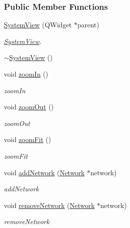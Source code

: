 \subsubsection*{Public Member Functions}
\begin{DoxyCompactItemize}
\item 
\hyperlink{group___graphics_ga660a455ff7b98cb92410b0bf1cbb2eeb}{System\+View} (Q\+Widget $\ast$parent)
\begin{DoxyCompactList}\small\item\em \hyperlink{class_system_view}{System\+View}. \end{DoxyCompactList}\item 
\hyperlink{group___graphics_ga0091352981c1efa5498819b69698db44}{$\sim$\+System\+View} ()
\item 
void \hyperlink{group___graphics_ga93170319ee5fbf9098353b383fc8a368}{zoom\+In} ()
\begin{DoxyCompactList}\small\item\em zoom\+In \end{DoxyCompactList}\item 
void \hyperlink{group___graphics_gaf971471c76265ec21cdde2aafe9b609f}{zoom\+Out} ()
\begin{DoxyCompactList}\small\item\em zoom\+Out \end{DoxyCompactList}\item 
void \hyperlink{group___graphics_gac1bf0b6a80216df74a8da1cb8ac5f0e8}{zoom\+Fit} ()
\begin{DoxyCompactList}\small\item\em zoom\+Fit \end{DoxyCompactList}\item 
void \hyperlink{group___graphics_gae183447d0777c7b2b940a977f9b64c3f}{add\+Network} (\hyperlink{class_network}{Network} $\ast$network)
\begin{DoxyCompactList}\small\item\em add\+Network \end{DoxyCompactList}\item 
void \hyperlink{group___graphics_ga2078ad08ff93b9a8683d567e3f9f714e}{remove\+Network} (\hyperlink{class_network}{Network} $\ast$network)
\begin{DoxyCompactList}\small\item\em remove\+Network \end{DoxyCompactList}\end{DoxyCompactItemize}
